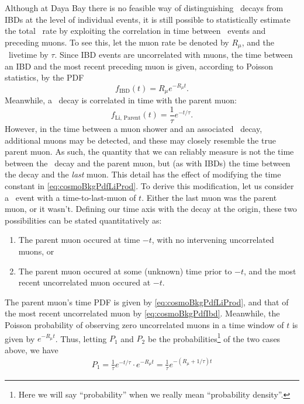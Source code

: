 \documentclass[../thesis.tex]{subfiles}
\begin{document}
Although at Daya Bay there is no feasible way of distinguishing \linine\ decays from IBDs at the level of individual events, it is still possible to statistically estimate the total \linine\ rate by exploiting the correlation in time between \linine\ events and preceding muons. To see this, let the muon rate be denoted by $R_\mu$, and the \linine\ livetime by $\tau$. Since IBD events are uncorrelated with muons, the time between an IBD and the most recent preceding muon is given, according to Poisson statistics, by the PDF
\begin{equation}
  \label{eq:cosmoBkgPdfIbd}
  f_{\mathrm{IBD}}(t) = R_\mu e^{-R_\mu t}.
\end{equation}
Meanwhile, a \linine\ decay is correlated in time with the parent muon:
\begin{equation}
  \label{eq:cosmoBkgPdfLiProd}
  f_{\mathrm{Li,\,Parent}}(t) = \frac{1}{\tau} e^{-t/\tau}.
\end{equation}
However, in the time between a muon shower and an associated \linine\ decay, additional muons may be detected, and these may closely resemble the true parent muon. As such, the quantity that we can reliably measure is not the time between the \linine\ decay and the parent muon, but (as with IBDs) the time between the decay and the \emph{last} muon. This detail has the effect of modifying the time constant in \autoref{eq:cosmoBkgPdfLiProd}. To derive this modification, let us consider a \linine\ event with a time-to-last-muon of $t$. Either the last muon was the parent muon, or it wasn't. Defining our time axis with the decay at the origin, these two possibilities can be stated quantitatively as:
\begin{enumerate}
\item The parent muon occured at time $-t$, with no intervening uncorrelated muons, or
\item The parent muon occured at some (unknown) time prior to $-t$, and the most recent uncorrelated muon occured at $-t$.
\end{enumerate}
The parent muon's time PDF is given by \autoref{eq:cosmoBkgPdfLiProd}, and that of the most recent uncorrelated muon by \autoref{eq:cosmoBkgPdfIbd}. Meanwhile, the Poisson probability of observing zero uncorrelated muons in a time window of $t$ is given by $e^{-R_\mu t}$. Thus, letting $P_1$ and $P_2$ be the probabilities\footnote{Here we will say ``probability'' when we really mean ``probability density''.} of the two cases above, we have
\begin{align*}
  P_1 = \frac{1}{\tau} e^{-t/\tau} \cdot e^{-R_\mu t} = \frac{1}{\tau}e^{-(R_\mu + 1/\tau)t}
\end{align*}
\end{document}
